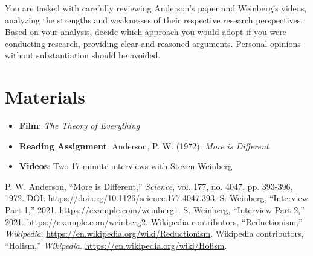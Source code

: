 \documentclass[a4paper,12pt]{article}
\begin{document}
You are tasked with carefully reviewing Anderson's paper and Weinberg’s videos, analyzing the strengths and weaknesses of their respective research perspectives. Based on your analysis, decide which approach you would adopt if you were conducting research, providing clear and reasoned arguments. Personal opinions without substantiation should be avoided.

\section*{Materials}

\begin{itemize}
    \item \textbf{Film}: \textit{The Theory of Everything}
    \item \textbf{Reading Assignment}: Anderson, P. W. (1972). \textit{More is Different} \cite{doi:10.1126/science.177.4047.393}
    \item \textbf{Videos}: Two 17-minute interviews with Steven Weinberg \cite{Weinberg2021, Weinberg2021Part2}
\end{itemize}

\begin{thebibliography}{99}
     P. W. Anderson, ``More is Different,'' \textit{Science}, vol. 177, no. 4047, pp. 393-396, 1972. DOI: \url{https://doi.org/10.1126/science.177.4047.393}.
     S. Weinberg, ``Interview Part 1,'' 2021. \url{https://example.com/weinberg1}.
     S. Weinberg, ``Interview Part 2,'' 2021. \url{https://example.com/weinberg2}.
     Wikipedia contributors, ``Reductionism,'' \textit{Wikipedia}. \url{https://en.wikipedia.org/wiki/Reductionism}.
     Wikipedia contributors, ``Holism,'' \textit{Wikipedia}. \url{https://en.wikipedia.org/wiki/Holism}.
\end{thebibliography}
\end{document}
